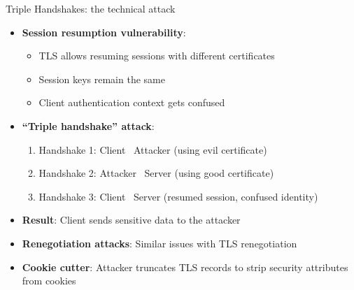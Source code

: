 \ifdefined\PRESENTATION\else\PassOptionsToClass{handout}{beamer}\fi\documentclass[aspectratio=169, lualatex]{beamer}
\begin{document}
\begin{frame}{Triple Handshakes: the technical attack}
	\begin{itemize}
		\item \textbf{Session resumption vulnerability}:
		      \begin{itemize}
			      \item TLS allows resuming sessions with different certificates
			      \item Session keys remain the same
			      \item Client authentication context gets confused
		      \end{itemize}
		\item \textbf{``Triple handshake'' attack}:
		      \begin{enumerate}
			      \item Handshake 1: Client \leftrightarrow\ Attacker (using evil certificate)
			      \item Handshake 2: Attacker \leftrightarrow\ Server (using good certificate)
			      \item Handshake 3: Client \leftrightarrow\ Server (resumed session, confused identity)
		      \end{enumerate}
		\item \textbf{Result}: Client sends sensitive data to the attacker
		\item \textbf{Renegotiation attacks}: Similar issues with TLS renegotiation
		\item \textbf{Cookie cutter}: Attacker truncates TLS records to strip security attributes from cookies
	\end{itemize}
\end{frame}
\end{document}
